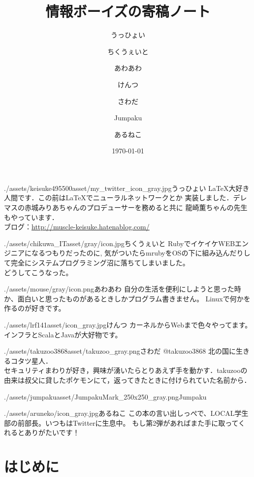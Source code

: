 \documentclass[autodetect-engine,dvipdfmx-if-dvi,ja=standard,a5paper,10.5pt,twoside,openany,layout=v2]{bxjsbook}
\title{情報ボーイズの寄稿ノート}
\author{うっひょい \and ちくうぇいと \and あわあわ \and けんつ \and さわだ \and Jumpaku \and あるねこ}
\date{\today}
\newcommand{\articlepath}{./articles}
\newcommand{\assetspath}{./assets}
\newcommand{\jumpakuasset}{\assetspath/jumpakuasset}
\newcommand{\takuzooasset}{\assetspath/takuzoo3868asset}
\newcommand{\lrfasset}{\assetspath/lrf141asset}
\newcommand{\materialofmouseasset}{\assetspath/mouse/gray}
\newcommand{\keisukeasset}{\assetspath/keisuke495500asset}
\newcommand{\chikuwaitasset}{\assetspath/chikuwa_ITasset/gray}
\begin{document}
\frontmatter
\maketitle
\begin{myintroduce}{\keisukeasset/my_twitter_icon_gray.jpg}{うっひょい}
  \LaTeX 大好き人間です．この前は\LaTeX でニューラルネットワークとか
  実装しました．デレマスの赤城みりあちゃんのプロデューサーを務めると共に
  龍崎薫ちゃんの先生もやっています．\\
  ブログ：\url{http://muscle-keisuke.hatenablog.com/}
\end{myintroduce}
\begin{myintroduce}{\chikuwaitasset/icon.jpg}{ちくうぇいと}
  RubyでイケイケWEBエンジニアになるつもりだったのに, 気がついたらmrubyをOSの下に組み込んだりして完全にシステムプログラミング沼に落ちてしまいました。\\
  どうしてこうなった。
\end{myintroduce}
\begin{myintroduce}{\materialofmouseasset/icon.png}{あわあわ}
  自分の生活を便利にしようと思った時か、面白いと思ったものがあるときしかプログラム書きません。
  Linuxで何かを作るのが好きです。
\end{myintroduce}
\begin{myintroduce}{\lrfasset/icon_gray.jpg}{けんつ}
  カーネルからWebまで色々やってます。\\
  インフラとScalaとJavaが大好物です。
\end{myintroduce}
\begin{myintroduce}{\takuzooasset/takuzoo_gray.png}{さわだ @takuzoo3868}
  北の国に生きるコタツ星人．\\
  セキュリティまわりが好き，興味が湧いたらとりあえず手を動かす．takuzooの由来は叔父に貸したポケモンにて，返ってきたときに付けられていた名前から．
\end{myintroduce}
\begin{myintroduce}{\jumpakuasset/JumpakuMark_250x250_gray.png}{Jumpaku}

\end{myintroduce}

\begin{myintroduce}{./assets/aruneko/icon_gray.jpg}{あるねこ}
  この本の言い出しっぺで、LOCAL学生部の前部長。いつもはTwitterに生息中。
  もし第2弾があればまた手に取ってくれるとありがたいです！
\end{myintroduce}

\chapter{はじめに}

\end{document}
